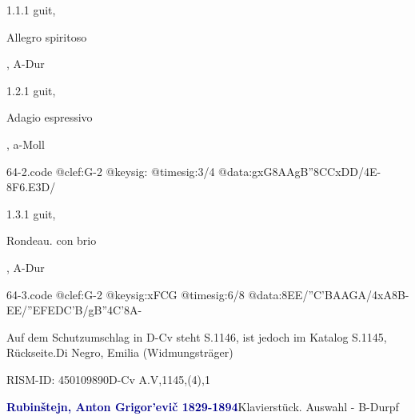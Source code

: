\documentclass[a4paper, twocolumn, 11pt]{book}
\begin{document}
\par 1.1.1  guit, \begin{itshape}Allegro spiritoso\end{itshape}, A-Dur  
\begin{filecontents*}{64-1.code}
@clef:G-2
@keysig:xFCG
@timesig:c
@data:4''A8-{6FE}{8xDEnD'B}/4A--{8.''F6E}/'4B-''4.C'8B}/4B--{8.B''6C}/
\end{filecontents*}
\newline %
\par 1.2.1  guit, \begin{itshape}Adagio espressivo\end{itshape}, a-Moll  
\begin{filecontents*}{64-2.code}
@clef:G-2
@keysig:
@timesig:3/4
@data:gxG{8AA}gB''{8CC}{xDD}/4E-{8F6.E3D}/
\end{filecontents*}
\newline %
\par 1.3.1  guit, \begin{itshape}Rondeau. con brio\end{itshape}, A-Dur  
\begin{filecontents*}{64-3.code}
@clef:G-2
@keysig:xFCG
@timesig:6/8
@data:{8EE}/''{C'BA}{AGA}/4xA8B-{EE}/''{EFE}{DC'B}/gB''4C'8A-
\end{filecontents*}
\newline %
\par Auf dem Schutzumschlag in D-Cv steht {\textquotedbl}S.1146{\textquotedbl}, ist jedoch im Katalog S.1145, Rückseite.\newline Di Negro, Emilia  (Widmungsträger)
\par RISM-ID: 450109890\newline D-Cv  A.V,1145,(4),1
\par \vspace{16pt} \textcolor{darkblue}{\textbf{Rubinštejn, Anton Grigor'evič  1829-1894}}\hfillplus{[65]}\newline Klavierstück. Auswahl - B-Dur\newline pf
\end{document}
